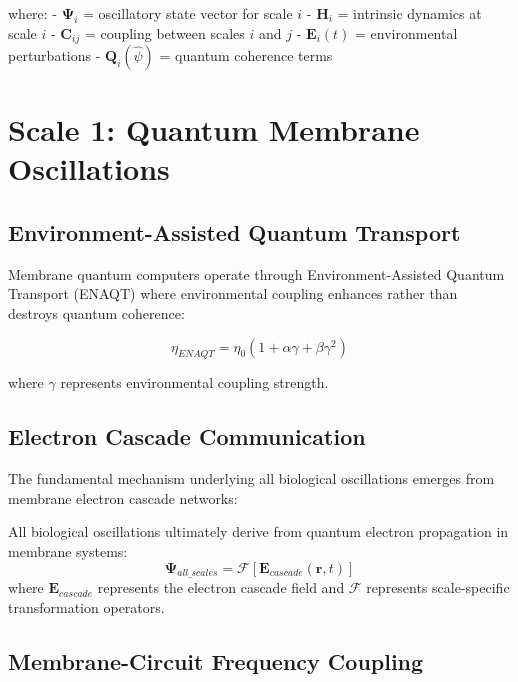 \documentclass[twocolumn]{article}
\begin{document}
where:
- $\mathbf{\Psi}_i$ = oscillatory state vector for scale $i$
- $\mathbf{H}_i$ = intrinsic dynamics at scale $i$
- $\mathbf{C}_{ij}$ = coupling between scales $i$ and $j$
- $\mathbf{E}_i(t)$ = environmental perturbations
- $\mathbf{Q}_i(\hat{\psi})$ = quantum coherence terms

\section{Scale 1: Quantum Membrane Oscillations}

\subsection{Environment-Assisted Quantum Transport}

Membrane quantum computers operate through Environment-Assisted Quantum Transport (ENAQT) where environmental coupling enhances rather than destroys quantum coherence:

\begin{equation}
\eta_{ENAQT} = \eta_0 \left(1 + \alpha\gamma + \beta\gamma^2\right)
\end{equation}

where $\gamma$ represents environmental coupling strength.

\subsection{Electron Cascade Communication}

The fundamental mechanism underlying all biological oscillations emerges from membrane electron cascade networks:

\begin{theorem}
All biological oscillations ultimately derive from quantum electron propagation in membrane systems:
\begin{equation}
\mathbf{\Psi}_{all\_scales} = \mathcal{F}[\mathbf{E}_{cascade}(\mathbf{r}, t)]
\end{equation}
where $\mathbf{E}_{cascade}$ represents the electron cascade field and $\mathcal{F}$ represents scale-specific transformation operators.
\end{theorem}

\subsection{Membrane-Circuit Frequency Coupling}
\end{document}
